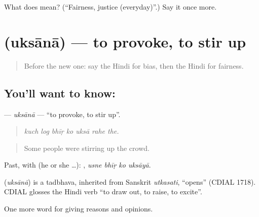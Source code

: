 \begin{tcolorbox}[breakable,colback=teal!4,colframe=teal!35!black,title={Before you move on}]
What does  mean? (\textquotedblleft{}Fairness, justice (everyday)\textquotedblright{}.) Say it once more.
\end{tcolorbox}
\section[\texorpdfstring{\hi{उकसाना} (uksānā)}{उकसाना (uksānā)}]{ (uksānā) — to provoke, to stir up}

\label{lesson:HI-C356-uksana}



\begin{quote}
Before the new one: say the Hindi for bias, then the Hindi for fairness.
\end{quote}

\subsection*{You'll want to know: }
\textbf{} — \emph{uksānā} — \textquotedblleft{}to provoke, to stir up\textquotedblright{}.

\begin{quote}
      
\end{quote}

\begin{quote}
\emph{kuch log bhīṛ ko uksā rahe the.}
\end{quote}

\begin{quote}
Some people were stirring up the crowd.
\end{quote}

Past, with  (he or she …):    , \emph{usne bhīṛ ko uksāyā}.

\begin{cousinweb}
\textbf{} (\emph{uksānā}) is a tadbhava, inherited from Sanskrit \emph{utkasati}, \textquotedblleft{}opens\textquotedblright{} (CDIAL 1718). CDIAL glosses the Hindi verb \textquotedblleft{}to draw out, to raise, to excite\textquotedblright{}.
\end{cousinweb}

\begin{grammarlens}[title={What you've built}]
One more word for giving reasons and opinions.
\end{grammarlens}

